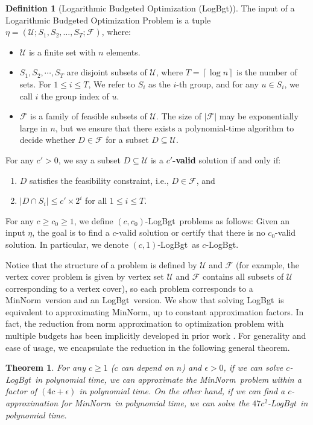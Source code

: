 \documentclass[11pt,a4paper]{article} \usepackage{enumitem}
\newcommand{\ceil}[1]{\left\lceil #1 \right\rceil}
\newcommand{\calF}{\mathcal{F}}
\newcommand{\calU}{\mathcal{U}}
\newcommand{\minnorm}{\textsf{MinNorm}}
\newcommand{\LBO}{\textsf{LogBgt}}
\newtheorem{theorem}{Theorem}[section]
\theoremstyle{definition}
\newtheorem{definition}{Definition}[section]
\begin{document}
\begin{definition}
[Logarithmic Budgeted Optimization (\LBO)]
\label{def:LBO}
The input of a Logarithmic Budgeted Optimization Problem is a tuple $\eta=(\calU;S_1,S_2,\ldots,S_{T};\calF)$, where:
\begin{itemize}
    \item $\calU$ is a finite set with $n$ elements.
    \item $S_1,S_2,\cdots, S_{T}$ are disjoint subsets of $\calU$, where $T=\ceil{\log n}$ is the number of sets. For $1\le i\le T$, We refer to $S_i$ as the $i$-th group, and for any $u\in S_i$, we call $i$ the group index of $u$. 
\item $\calF$ is a family of feasible subsets of $\calU$. The size of $|\calF|$ may be exponentially large in  $n$, but we ensure that there exists a polynomial-time algorithm to decide whether $D\in \calF$ for a subset $D\subseteq \calU$.
\end{itemize}
For any $c'>0$, we say a subset $D\subseteq \calU$ is a \textbf{$c'$-valid} solution if and only if:
\begin{enumerate}
    \item $D$ satisfies the feasibility constraint, i.e., $D\in \calF$, and 
    \item $|D\cap S_i|\le c'\times 2^i$ for all $1\le i\le T$.
\end{enumerate}
For any $c\ge c_0\ge 1$, we define $(c,c_0)$-\LBO\ problems as follows: 
Given an input $\eta$, the goal is 
to find a $c$-valid solution or certify that
there is no $c_0$-valid solution.
In particular, we denote $(c,1)$-\LBO\ 
as $c$-\LBO.
\end{definition}

Notice that the structure of a problem is defined by $\calU$ and $\calF$ (for example, the vertex cover problem is given by vertex set $\calU$ and $\calF$ contains all subsets of $\calU$ corresponding to a vertex cover), so each problem corresponds to a \minnorm\ version and an \LBO\ version.
We show that solving \LBO\ is equivalent to approximating \minnorm, up to constant approximation factors. 
In fact, the reduction from norm approximation to optimization problem with multiple budgets has been implicitly developed in prior work \cite{chakrabarty2019approximation,ibrahimpur2021minimum}. 
For generality and ease of usage, we encapsulate the reduction in the following general theorem.


\begin{theorem}
\label{thm:equivalence}
For any $c\geq 1$ ($c$ can depend on $n$) and $\epsilon>0$,
if we can solve $c$-\LBO\ in polynomial time, 
we can approximate the \minnorm\ problem within a factor of $(4c+\epsilon)$ in polynomial time.
On the other hand, if we can find a $c$-approximation for \minnorm\
in polynomial time, we can solve the $47c^2$-\LBO\ in polynomial time.
\end{theorem}
\end{document}
